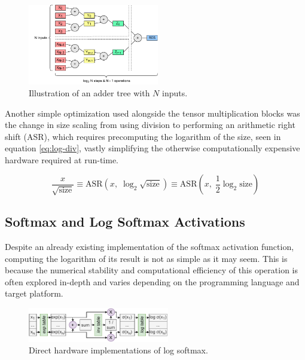 \begin{figure}[hpt!]
  \centering
  \includegraphics[trim={0cm 0cm 0cm 0cm}, width=0.51\textwidth, center]{quantization/adder_tree.pdf}
  \caption{Illustration of an adder tree with \(N\) inputs.}
  \label{fig:adder-tree}
\end{figure}

Another simple optimization used alongside the tensor multiplication blocks was the change in size scaling from using division to performing an arithmetic right shift (ASR), which requires precomputing the logarithm of the size, seen in equation \ref{eq:log-div}, vastly simplifying the otherwise computationally expensive hardware required at run-time.

\begin{equation}\label{eq:log-div}
  \frac{x}{\sqrt{\text{size}}} \equiv \text{ASR}(x,\; \log_2 \sqrt{\text{size}}) \equiv \text{ASR}(x,\; \frac{1}{2}\log_2 \text{size})
\end{equation}


\subsection{Softmax and Log Softmax Activations}\label{log-softmax}
Despite an already existing \hlsml implementation of the softmax activation function, computing the logarithm of its result is not as simple as it may seem. This is because the numerical stability and computational efficiency of this operation is often explored in-depth \cite{60-blanchard2019accurate} and varies depending on the programming language and target platform.

\begin{figure}[hpt!]
  \centering
  \includegraphics[trim={0cm 0cm 0cm 0cm}, width=0.55\textwidth, center]{quantization/log_softmax_naive_h.pdf}
  \caption{Direct hardware implementations of log softmax.}
  \label{fig:log-softmax-naive}
\end{figure}

